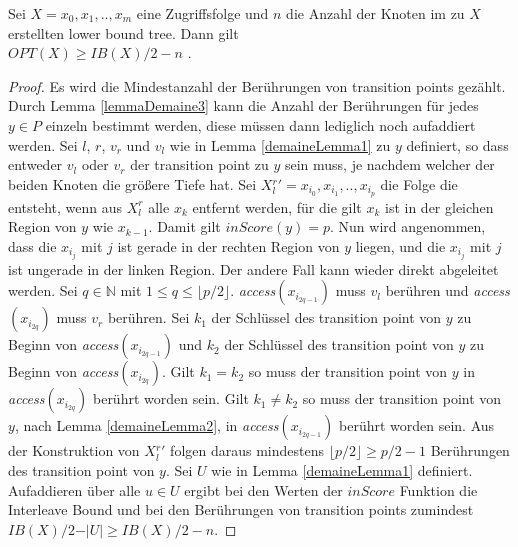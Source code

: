 \documentclass[a4paper,12pt]{article}
\begin{document}
\begin{Satz} \label{satzDemaine1}
	Sei $X = x_0, x_1,.., x_m$  eine Zugriffsfolge und $n$ die Anzahl der Knoten im zu $X$ erstellten lower bound tree. Dann gilt\\	
	$\mathit{OPT}\left(X\right) \geq \mathit{IB}\left(X\right) /2 - n$ .
\end{Satz}
\begin{proof}
	Es wird die Mindestanzahl der Berührungen von transition points gezählt. Durch Lemma \ref{lemmaDemaine3} kann die Anzahl der Berührungen für jedes $y \in P$ einzeln bestimmt werden, diese müssen dann lediglich noch aufaddiert werden. Sei $l$, $r$, $v_r$ und $v_l$ wie in Lemma \ref{demaineLemma1} zu $y$ definiert, so dass entweder $v_l$ oder $v_r$ der transition point zu $y$ sein muss, je nachdem welcher der beiden Knoten die größere Tiefe hat. Sei $X{^r_l}' = x_{i_0},x_{i_1},..,x_{i_p}$ die Folge die entsteht, wenn aus $X^r_l$ alle $x_k$ entfernt werden, für die gilt $x_k$ ist in der gleichen Region von $y$ wie $x_{k-1}$. Damit gilt $\mathit{inScore}\left(y\right) = p$. Nun wird angenommen, dass die $x_{i_j}$ mit $j$ ist gerade in der rechten Region von $y$ liegen, und die $x_{i_j}$ mit $j$ ist ungerade in der linken Region. Der andere Fall kann wieder direkt abgeleitet werden. Sei $q \in \mathbb{N}$ mit $1 \leq q \leq \lfloor p / 2 \rfloor$. \textit{access}$\left( x_{i_{2q-1}} \right)$ muss $v_l$ berühren und \textit{access}$\left( x_{i_{2q}} \right)$ muss $v_r$ berühren. Sei $k_{1}$ der Schlüssel des transition point von $y$ zu Beginn von \textit{access}$\left( x_{i_{2q-1}} \right)$ und  $k_{2}$ der Schlüssel des transition point von $y$ zu Beginn von \textit{access}$\left( x_{i_{2q}} \right)$. Gilt $k_{1} = k_{2}$ so muss der transition point von $y$ in \textit{access}$\left( x_{i_{2q}} \right)$ berührt worden sein.  Gilt $k_{1} \ne k_{2}$ so muss der transition point von $y$, nach Lemma \ref{demaineLemma2}, in \textit{access}$\left( x_{i_{2q-1}} \right)$ berührt worden sein. Aus der Konstruktion von $X{^r_l}'$ folgen daraus mindestens $\lfloor p/2 \rfloor \geq p/2 - 1$ Berührungen des transition point von $y$. Sei $U$ wie in Lemma  \ref{demaineLemma1} definiert. Aufaddieren über alle $u \in U$ ergibt bei den Werten der $\mathit{inScore}$ Funktion die Interleave Bound und bei den Berührungen von transition points zumindest  $\mathit{IB}\left(X\right) /2 - \vert U \vert \geq \mathit{IB}\left(X\right) /2 - n$.
	
\end{proof}
\end{document}
